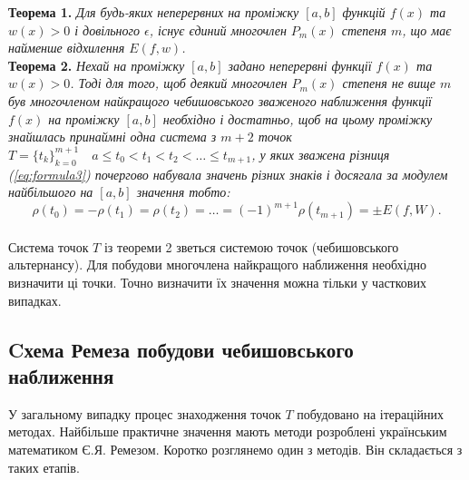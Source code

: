 \documentclass[ukrainian,14pt]{extarticle}
\def\ab{[a,b]}
\begin{document}
\noindent
\textbf{Теорема 1.}\textit{
Для будь-яких неперервних на проміжку $[a,b]$ функцій $f(x)$ та $w(x) > 0$ і довільного $\epsilon$, існує єдиний многочлен $P_m(x)$ степеня $m$, що має найменше відхилення $E(f,w)$.}\\

\noindent
\textbf{Теорема 2.}\textit{
Нехай на проміжку $[a,b]$ задано неперервні функції $f(x)$ та $w(x) > 0$.
Тоді для того, щоб деякий многочлен $P_m(x)$ степеня не вище $m$ був многочленом найкращого чебишовського зваженого наближення функції $f(x)$ на проміжку $\ab$ необхідно і достатньо, щоб на цьому проміжку знайшлась принаймні одна система з $m+2$ точок \\ $T=\{t_k\}_{k=0}^{m+1} \quad a \leq t_0 < t_1 < t_2 < \ldots \leq t_{m+1}$, у яких зважена різниця (\ref{eq:formula3}) почергово набувала значень різних знаків і досягала за модулем найбільшого на $\ab$ значення тобто:
}
\begin{equation}\label{eq:formula5}
\rho(t_0) = -\rho(t_1) = \rho(t_2) = \ldots = (-1)^{m+1}\rho(t_{m+1}) = \pm E(f,W).
\end{equation}\\


Система точок $T$ із теореми 2 зветься системою точок (чебишовського альтернансу). Для побудови многочлена найкращого наближення  необхідно визначити ці точки. Точно визначити їх значення можна тільки у часткових випадках. 

\subsection{Cхема Ремеза побудови чебишовського наближення}

У загальному випадку процес знаходження точок $T$ побудовано на ітераційних методах. Найбільше практичне значення мають методи розроблені українським математиком Є.Я. Ремезом. Коротко розглянемо один з методів. Він складається з таких етапів.
\end{document}
